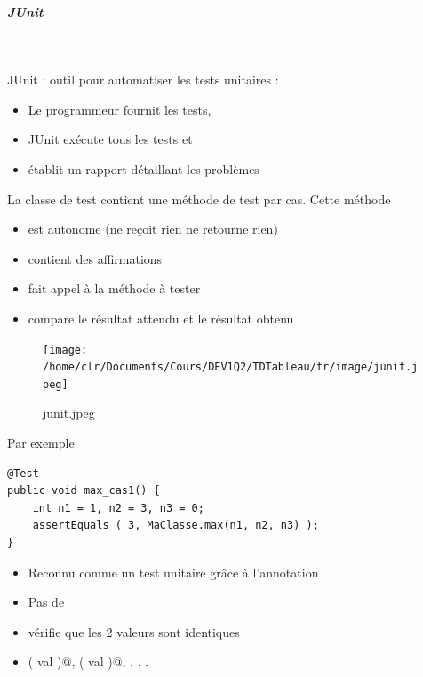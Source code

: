 \documentclass[11pt,a4paper]{article}
\begin{document}
            \par
        
			
		\subparagraph{JUnit} 
		
					\textcolor{white}{.} \par
				
          JUnit : outil pour automatiser les tests unitaires :
          
					\begin{itemize}
				
			\item Le programmeur fournit les tests,
			\item JUnit ex\'ecute tous les tests et
			\item \'etablit un rapport d\'etaillant les probl\`emes
					\end{itemize}
				
            \par
        
          La classe de test contient une m\'ethode de test par cas. Cette m\'ethode
          
					\begin{itemize}
				
			\item est autonome (ne re\c coit rien ne retourne rien)
			\item contient des affirmations
			\item fait appel \`a la m\'ethode \`a tester
			\item compare le r\'esultat attendu et le r\'esultat obtenu
					\end{itemize}
				
            \par
        \begin{figure}[hbt]
				    \begin{center}
					\texttt{[image: /home/clr/Documents/Cours/DEV1Q2/TDTableau/fr/image/junit.jpeg]}
						\end{center}
                
                    \caption[junit.jpeg]{junit.jpeg}
                \end{figure}
                    
            \par
        Par exemple
            \par
        \begin{verbatim}
@Test
public void max_cas1() {
    int n1 = 1, n2 = 3, n3 = 0;
    assertEquals ( 3, MaClasse.max(n1, n2, n3) );
}
\end{verbatim}
					\begin{itemize}
				
			\item Reconnu comme un test unitaire gr\^ace \`a l'annotation \verb@@Test@
			\item Pas de \verb@static@
			\item \verb@assertEquals@ v\'erifie que les 2 valeurs sont identiques
			\item \verb@assertTrue ( val )@, \verb@assertFalse ( val )@, . . .
					\end{itemize}
				
\end{document}
